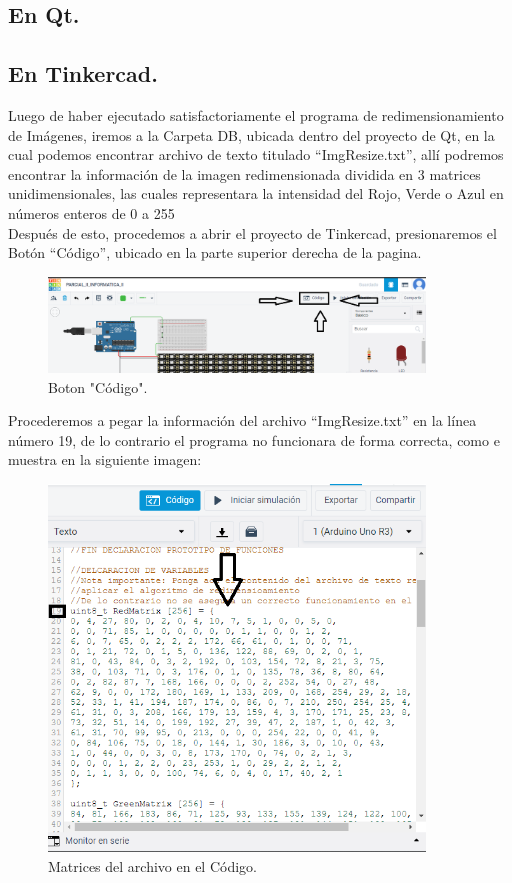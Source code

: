 \documentclass{article}
\begin{document}
\subsection{En Qt.}
\subsection{En Tinkercad.}
Luego de haber ejecutado satisfactoriamente el programa de redimensionamiento de Imágenes, iremos a la Carpeta DB, ubicada dentro del proyecto de Qt, en la cual podemos encontrar archivo de texto titulado “ImgResize.txt”, allí podremos encontrar la información de la imagen redimensionada dividida en 3 matrices unidimensionales, las cuales representara la intensidad del Rojo, Verde o Azul en números enteros de 0 a 255
\\
Después de esto, procedemos a abrir el proyecto de Tinkercad, presionaremos el Botón “Código”, ubicado en la parte superior derecha de la pagina.
\begin{figure}[h]
  \includegraphics[width=10cm]{codigo.PNG}
  \centering
  \caption{Boton "Código".}
  \label{fig:Codigo}
\end{figure}
Procederemos a pegar la información del archivo “ImgResize.txt” en la línea número 19, de lo contrario el programa no funcionara de forma correcta, como e muestra en la siguiente imagen:
\begin{figure}[h]
  \includegraphics[width=10cm]{matrices.PNG}
  \centering
  \caption{Matrices del archivo en el Código.}
  \label{fig:matrices}
\end{figure}
\end{document}
